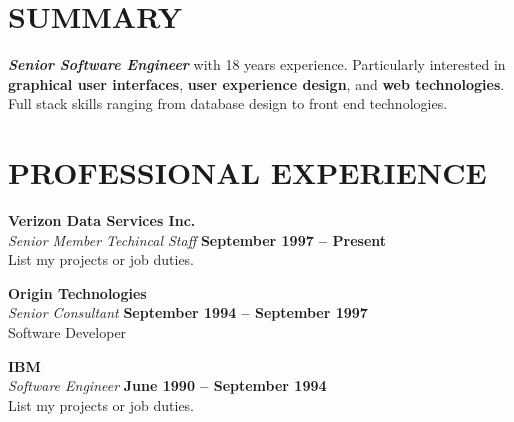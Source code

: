 \documentclass[margin,line]{resume}
\begin{document}
\begin{resume}

    \vspace{-3mm}

    \section{\mysidestyle \textbf{\large{S}\small{UMMARY}}}

    \textbf{\textsl{Senior Software Engineer}} with 18 years experience.  Particularly interested in \textbf{graphical user interfaces}, \textbf{user experience design}, and \textbf{web technologies}.  Full stack skills ranging from database design to front end technologies.

    \vspace{-1mm}

\sectionline

    \section{\mysidestyle \textbf{\large{P}\small{ROFESSIONAL} \large{E}\small{XPERIENCE}}}

    \textbf{\listing Verizon Data Services Inc.} \vspace{2mm}\\\vspace{1mm}%
    \textsl{Senior Member Techincal Staff} \hfill \textbf{September 1997 -- Present}\\
    List my projects or job duties.

    \textbf{\listing Origin Technologies} \vspace{2mm}\\\vspace{1mm}%
    \textsl{Senior Consultant} \hfill \textbf{September 1994 -- September 1997}\\
    Software Developer

    \textbf{\listing IBM} \vspace{2mm}\\\vspace{1mm}%
    \textsl{Software Engineer} \hfill \textbf{June 1990 -- September 1994}\\
    List my projects or job duties.



\end{resume}
\end{document}
